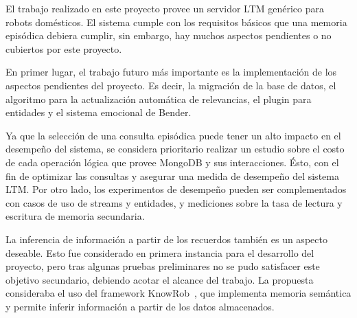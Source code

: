 \begin{conclusion}
El trabajo realizado en este proyecto provee un servidor LTM genérico para robots domésticos. El sistema cumple con los requisitos básicos que una memoria episódica debiera cumplir, sin embargo, hay muchos aspectos pendientes o no cubiertos por este proyecto.

En primer lugar, el trabajo futuro más importante es la implementación de los aspectos pendientes del proyecto. Es decir, la migración de la base de datos, el algoritmo para la actualización automática de relevancias, el plugin para entidades y el sistema emocional de Bender.

Ya que la selección de una consulta episódica puede tener un alto impacto en el desempeño del sistema, se considera prioritario realizar un estudio sobre el costo de cada operación lógica que provee MongoDB y sus interacciones. Ésto, con el fin de optimizar las consultas y asegurar una medida de desempeño del sistema LTM. Por otro lado, los experimentos de desempeño pueden ser complementados con casos de uso de streams y entidades, y mediciones sobre la tasa de lectura y escritura de memoria secundaria.

La inferencia de información a partir de los recuerdos también es un aspecto deseable. Esto fue considerado en primera instancia para el desarrollo del proyecto, pero tras algunas pruebas preliminares no se pudo satisfacer este objetivo secundario, debiendo acotar el alcance del trabajo. La propuesta consideraba el uso del framework KnowRob~\cite{Winkler2014,Tenorth2013,Tenorth2009}, que implementa memoria semántica y permite inferir información a partir de los datos almacenados.



\end{conclusion}